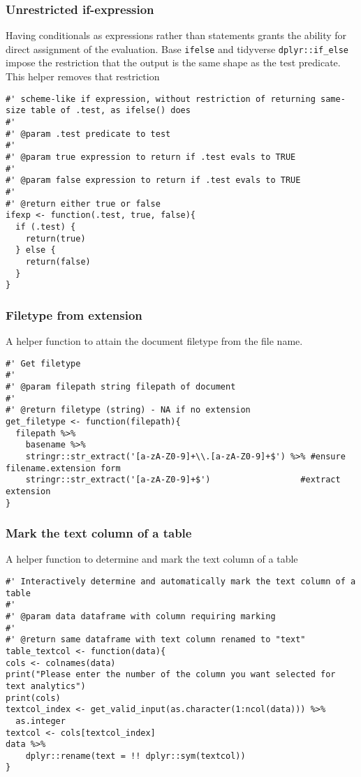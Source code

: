 \documentclass[a4paper, 11pt]{article}
\begin{document}
\subsubsection{Unrestricted if-expression}
\label{sec:org2c94b2c}
Having conditionals as expressions rather than statements grants the
ability for direct assignment of the evaluation. Base \texttt{ifelse} and
tidyverse \texttt{dplyr::if\_else} impose the restriction that the output is the same
shape as the test predicate. This helper removes that restriction
\begin{verbatim}
#' scheme-like if expression, without restriction of returning same-size table of .test, as ifelse() does
#'
#' @param .test predicate to test
#'
#' @param true expression to return if .test evals to TRUE
#'
#' @param false expression to return if .test evals to TRUE
#'
#' @return either true or false
ifexp <- function(.test, true, false){
  if (.test) {
    return(true)
  } else {
    return(false)
  }
}
\end{verbatim}
\subsubsection{Filetype from extension}
\label{sec:org1b0f16d}
A helper function to attain the document filetype from the file name.
\begin{verbatim}
#' Get filetype
#'
#' @param filepath string filepath of document
#'
#' @return filetype (string) - NA if no extension
get_filetype <- function(filepath){
  filepath %>%
    basename %>%
    stringr::str_extract('[a-zA-Z0-9]+\\.[a-zA-Z0-9]+$') %>% #ensure filename.extension form
    stringr::str_extract('[a-zA-Z0-9]+$')                  #extract extension
}
\end{verbatim}
\subsubsection{Mark the text column of a table}
\label{sec:orgaf118ea}
A helper function to determine and mark the text column of a table
\begin{verbatim}
#' Interactively determine and automatically mark the text column of a table
#'
#' @param data dataframe with column requiring marking
#'
#' @return same dataframe with text column renamed to "text"
table_textcol <- function(data){
cols <- colnames(data)
print("Please enter the number of the column you want selected for text analytics")
print(cols)
textcol_index <- get_valid_input(as.character(1:ncol(data))) %>%
  as.integer 
textcol <- cols[textcol_index]  
data %>%
    dplyr::rename(text = !! dplyr::sym(textcol))
}
\end{verbatim}
\end{document}
